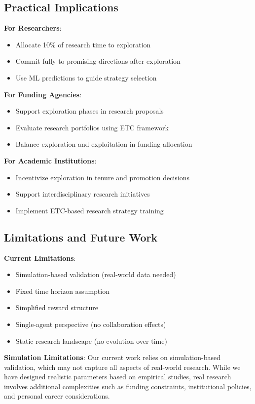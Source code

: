 \documentclass[letterpaper]{article} %
\begin{document}
\subsection{Practical Implications}

\textbf{For Researchers}:
\begin{itemize}
\item Allocate 10\% of research time to exploration
\item Commit fully to promising directions after exploration
\item Use ML predictions to guide strategy selection
\end{itemize}

\textbf{For Funding Agencies}:
\begin{itemize}
\item Support exploration phases in research proposals
\item Evaluate research portfolios using ETC framework
\item Balance exploration and exploitation in funding allocation
\end{itemize}

\textbf{For Academic Institutions}:
\begin{itemize}
\item Incentivize exploration in tenure and promotion decisions
\item Support interdisciplinary research initiatives
\item Implement ETC-based research strategy training
\end{itemize}

\subsection{Limitations and Future Work}

\textbf{Current Limitations}:
\begin{itemize}
\item Simulation-based validation (real-world data needed)
\item Fixed time horizon assumption
\item Simplified reward structure
\item Single-agent perspective (no collaboration effects)
\item Static research landscape (no evolution over time)
\end{itemize}

\textbf{Simulation Limitations}: Our current work relies on simulation-based validation, which may not capture all aspects of real-world research. While we have designed realistic parameters based on empirical studies, real research involves additional complexities such as funding constraints, institutional policies, and personal career considerations.
\end{document}
